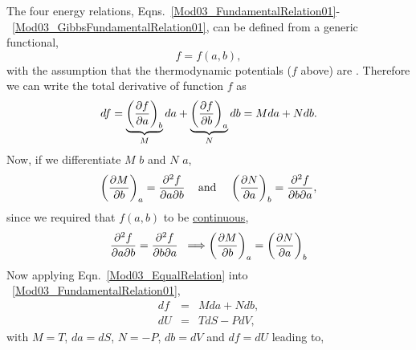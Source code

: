 The four energy relations, Eqns.~\ref{Mod03_FundamentalRelation01}-~\ref{Mod03_GibbsFundamentalRelation01}, can be defined from a generic functional, 
   \begin{displaymath}
    f = f(a,b),
   \end{displaymath}
with the assumption that the thermodynamic potentials ($f$ above) are . Therefore we can write the total derivative of function $f$ as
   \begin{displaymath}
         df = \underbrace{\left(\displaystyle\frac{\partial f}{\partial a}\right)_{b}}_{M}da + \underbrace{\left(\displaystyle\frac{\partial f}{\partial b}\right)_{a}}_{N}db = Mda + Ndb.
   \end{displaymath}
Now, if we differentiate $M$ \wrt $b$ and $N$ \wrt $a$,
   \begin{displaymath}
         \left(\displaystyle\frac{\partial M}{\partial b}\right)_{a} = \displaystyle\frac{\partial^{2}f}{\partial a\partial b} \;\;\;\text{ and }\;\;\; \left(\displaystyle\frac{\partial N}{\partial a}\right)_{b} = \displaystyle\frac{\partial^{2}f}{\partial b\partial a},
   \end{displaymath}
since we required that $f(a,b)$ to be \underline{continuous}, 
   \begin{equation}
         \displaystyle\frac{\partial^{2}f}{\partial a\partial b} = \displaystyle\frac{\partial^{2}f}{\partial b\partial a}\;\;\Longrightarrow \left(\displaystyle\frac{\partial M}{\partial b}\right)_{a} = \left(\displaystyle\frac{\partial N}{\partial a}\right)_{b}\label{Mod03_EqualRelation}
   \end{equation}
Now applying Eqn.~\ref{Mod03_EqualRelation} into ~\ref{Mod03_FundamentalRelation01},
   \begin{eqnarray}
        df &=& Mda + Ndb, \nonumber \\
        dU &=& TdS - PdV, \nonumber
   \end{eqnarray}
with $M=T$, $da=dS$, $N=-P$, $db = dV$ and $df = dU$ leading to,
